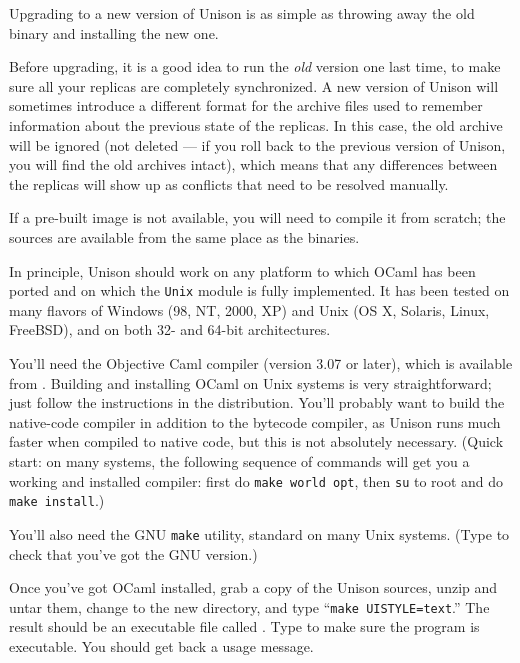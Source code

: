 \documentclass{article}
\begin{document}

Upgrading to a new version of Unison is as simple as throwing away the old
binary and installing the new one.

Before upgrading, it is a good idea to run the {\em old} version one last
time, to make sure all your replicas are completely synchronized.  A new
version of Unison will sometimes introduce a different format for the
archive files used to remember information about the previous state of the
replicas.  In this case, the old archive will be ignored (not deleted --- if
you roll back to the previous version of Unison, you will find the old
archives intact), which means that any differences between the replicas will
show up as conflicts that need to be resolved manually.



If a pre-built image is not available, you will need to compile it from
scratch; the sources are available from the same place as the binaries.

In principle, Unison should work on any platform to which OCaml has been
ported and on which the \verb|Unix| module is fully implemented.  It has
been tested on many flavors of Windows (98, NT, 2000, XP) and Unix (OS X,
Solaris, Linux, FreeBSD), and on both 32- and 64-bit architectures.



You'll need the Objective Caml compiler (version 3.07 or later), which is
available from .  Building and installing OCaml
on Unix systems is very straightforward; just follow the instructions in the
distribution.  You'll probably want to build the native-code compiler in
addition to the bytecode compiler, as Unison runs much faster when compiled
to native code, but this is not absolutely necessary.
%
(Quick start: on many systems, the following sequence of commands will
get you a working and installed compiler: first do {\tt make world opt},
then {\tt su} to root and do {\tt make install}.)

You'll also need the GNU {\tt make} utility, standard on many Unix
systems. (Type  to check that you've got the
GNU version.)

Once you've got OCaml installed, grab a copy of the Unison sources,
unzip and untar them, change to the new  directory, and
type ``{\tt make UISTYLE=text}.''
The result should be an executable file called .
Type  to make sure the program is executable.  You
should get back a usage message.
\end{document}
